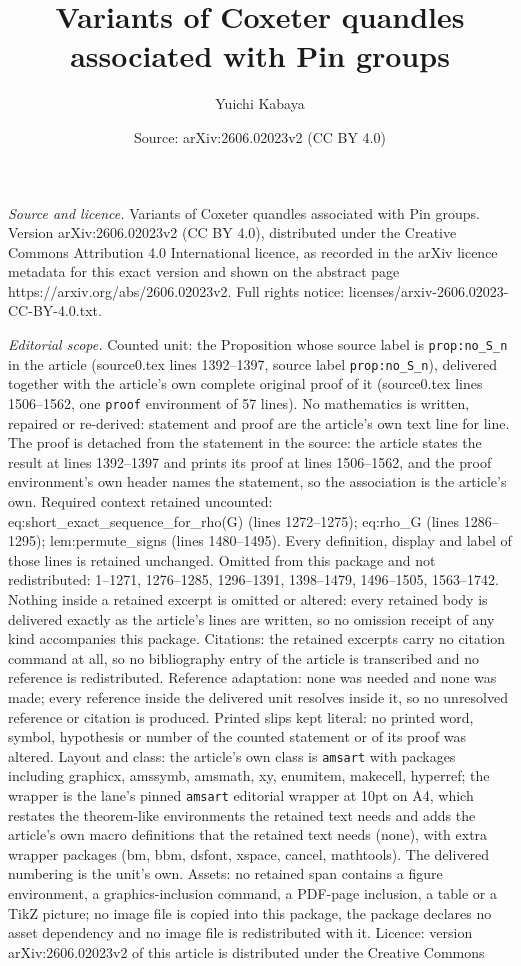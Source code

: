 \documentclass[10pt,a4paper]{amsart}
\title[Variants of Coxeter quandles associated with Pin groups]{Variants of Coxeter quandles associated with Pin groups}
\author{Yuichi Kabaya}
\date{Source: arXiv:2606.02023v2 (CC BY 4.0)}
\begin{document}
\maketitle

\noindent\emph{Source and licence.} Variants of Coxeter quandles associated with Pin groups. Version arXiv:2606.02023v2 (CC BY 4.0), distributed under the Creative Commons Attribution 4.0 International licence, as recorded in the arXiv licence metadata for this exact version and shown on the abstract page https://arxiv.org/abs/2606.02023v2. Full rights notice: licenses/arxiv-2606.02023-CC-BY-4.0.txt.\par\smallskip

\noindent\textit{Editorial scope.} Counted unit: the Proposition whose source label is \texttt{prop:no\_S\_n} in the article (source0.tex lines 1392--1397, source label \texttt{prop:no\_S\_n}), delivered together with the article's own complete original proof of it (source0.tex lines 1506--1562, one \texttt{proof} environment of 57 lines). No mathematics is written, repaired or re-derived: statement and proof are the article's own text line for line. The proof is detached from the statement in the source: the article states the result at lines 1392--1397 and prints its proof at lines 1506--1562, and the proof environment's own header names the statement, so the association is the article's own. Required context retained uncounted: eq:short\_exact\_sequence\_for\_rho(G) (lines 1272--1275); eq:rho\_G (lines 1286--1295); lem:permute\_signs (lines 1480--1495). Every definition, display and label of those lines is retained unchanged. Omitted from this package and not redistributed: 1--1271, 1276--1285, 1296--1391, 1398--1479, 1496--1505, 1563--1742. Nothing inside a retained excerpt is omitted or altered: every retained body is delivered exactly as the article's lines are written, so no omission receipt of any kind accompanies this package. Citations: the retained excerpts carry no citation command at all, so no bibliography entry of the article is transcribed and no reference is redistributed. Reference adaptation: none was needed and none was made; every reference inside the delivered unit resolves inside it, so no unresolved reference or citation is produced. Printed slips kept literal: no printed word, symbol, hypothesis or number of the counted statement or of its proof was altered. Layout and class: the article's own class is \texttt{amsart} with packages including graphicx, amssymb, amsmath, xy, enumitem, makecell, hyperref; the wrapper is the lane's pinned \texttt{amsart} editorial wrapper at 10pt on A4, which restates the theorem-like environments the retained text needs and adds the article's own macro definitions that the retained text needs (none), with extra wrapper packages (bm, bbm, dsfont, xspace, cancel, mathtools). The delivered numbering is the unit's own. Assets: no retained span contains a figure environment, a graphics-inclusion command, a PDF-page inclusion, a table or a TikZ picture; no image file is copied into this package, the package declares no asset dependency and no image file is redistributed with it. Licence: version arXiv:2606.02023v2 of this article is distributed under the Creative Commons 
\end{document}
